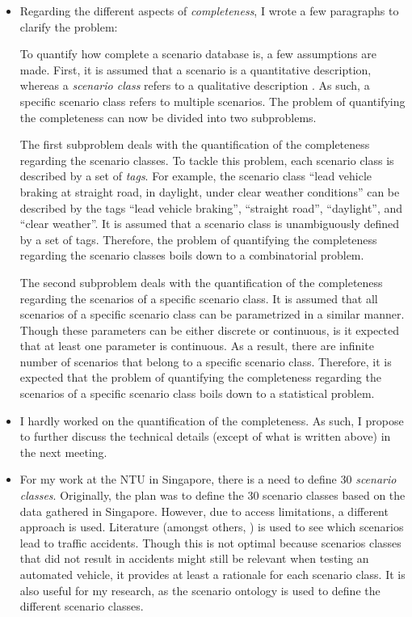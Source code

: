 \documentclass[10pt,final,a4paper,oneside,onecolumn]{article}
\begin{document}
\begin{itemize}
	\item Regarding the different aspects of \emph{completeness}, I wrote a few paragraphs to clarify the problem:
	
	To quantify how complete a scenario database is, a few assumptions are made. First, it is assumed that a scenario is a quantitative description, whereas a \emph{scenario class} refers to a qualitative description \cite{degelder2018ontology}. As such, a specific scenario class refers to multiple scenarios. The problem of quantifying the completeness can now be divided into two subproblems.
	
	The first subproblem deals with the quantification of the completeness regarding the scenario classes. To tackle this problem, each scenario class is described by a set of \emph{tags}. For example, the scenario class ``lead vehicle braking at straight road, in daylight, under clear weather conditions'' can be described by the tags ``lead vehicle braking'', ``straight road'', ``daylight'', and ``clear weather''. It is assumed that a scenario class is unambiguously defined by a set of tags. Therefore, the problem of quantifying the completeness regarding the scenario classes boils down to a combinatorial problem.
	
	The second subproblem deals with the quantification of the completeness regarding the scenarios of a specific scenario class. It is assumed that all scenarios of a specific scenario class can be parametrized in a similar manner. Though these parameters can be either discrete or continuous, is it expected that at least one parameter is continuous. As a result, there are infinite number of scenarios that belong to a specific scenario class. Therefore, it is expected that the problem of quantifying the completeness regarding the scenarios of a specific scenario class boils down to a statistical problem. 
	
	\item I hardly worked on the quantification of the completeness. As such, I propose to further discuss the technical details (except of what is written above) in the next meeting.
	
	\item For my work at the NTU in Singapore, there is a need to define 30 \emph{scenario classes}. Originally, the plan was to define the 30 scenario classes based on the data gathered in Singapore. However, due to access limitations, a different approach is used. Literature (amongst others, \cite{USDoT2007precrashscenarios, opdencamp2014cats, adaptive2017d73}) is used to see which scenarios lead to traffic accidents. Though this is not optimal because scenarios classes that did not result in accidents might still be relevant when testing an automated vehicle, it provides at least a rationale for each scenario class. It is also useful for my research, as the scenario ontology is used to define the different scenario classes.
	

\end{itemize}
\end{document}
